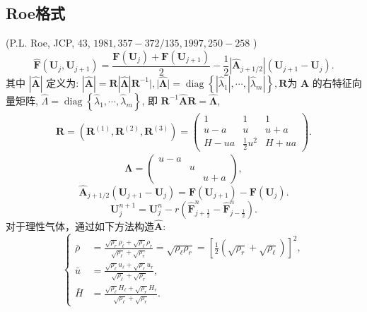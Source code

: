 \documentclass[12pt]{article}
\begin{document}
\subsection{Roe格式}

(P.L. Roe, JCP, 43, $1981,357-372 / 135,1997,250-258$ )
\begin{equation}
	\hat{\bm{F}}\left(\bm{U}_{j}, \bm{U}_{j+1}\right)=\frac{\bm{F}\left(\bm{U}_{j}\right)+\bm{F}\left(\bm{U}_{j+1}\right)}{2}-\frac{1}{2}\left|\hat{\bm{A}}_{j+1 / 2}\right|\left(\bm{U}_{j+1}-\bm{U}_{j}\right).
\end{equation}
其中 $|\hat{\bm{A}}|$ 定义为: $|\hat{\bm{A}}|=\bm{R}|\hat{\bm{\Lambda}}| \bm{R}^{-1}|,| \hat{\bm{\Lambda}} \mid=\operatorname{diag}\left\{\left|\hat{\lambda}_{1}\right|, \cdots,\left|\hat{\lambda}_{m}\right|\right\}, \bm{R}$为 $\hat{\bm{A}}$ 的右特征向量矩阵, $\hat{\Lambda}=\operatorname{diag}\left\{\hat{\lambda}_{1}, \cdots, \hat{\lambda}_{m}\right\}$, 即 $\bm{R}^{-1} \hat{\bm{A}} \bm{R}=\hat{\bm{\Lambda}}$,
\begin{equation}
	\begin{array}{c}
	\boldsymbol{R}=\left(\boldsymbol{R}^{(1)}, \boldsymbol{R}^{(2)}, \boldsymbol{R}^{(3)}\right)=\left(\begin{array}{ccc}
	1 & 1 & 1 \\
	u-a & u & u+a \\
	H-u a & \frac{1}{2} u^{2} & H+u a
	\end{array}\right).
	\end{array}
\end{equation}
\begin{equation}
	\bm{\Lambda} = \begin{pmatrix}
		u-a&&\\&u&\\&&u+a
	\end{pmatrix},
\end{equation}
\begin{equation}
	\hat{\bm{A}}_{j+1 / 2}\left(\bm{U}_{j+1}-\bm{U}_{j}\right)=\bm{F}\left(\bm{U}_{j+1}\right)-\bm{F}\left(\bm{U}_{j}\right).
\end{equation}
\begin{equation}
	\bm{U}^{n+1}_{j} =  \bm{U}^{n}_{j} - r \left( \hat{\bm{F}}^{n}_{j+\frac{1}{2}} - \hat{\bm{F}}^{n}_{j-\frac{1}{2}} \right).
\end{equation}
对于理性气体，通过如下方法构造$\hat{\bm{A}}$:
\begin{equation}
	\left\{
	\begin{aligned}
		\bar{\rho}&=\frac{\sqrt{\rho_{r}} \rho_{\ell}+\sqrt{\rho_{\ell}} \rho_{r}}{\sqrt{\rho_{\ell}}+\sqrt{\rho_{r}}}=\sqrt{\rho_{\ell} \rho_{r}}=\left[\frac{1}{2}\left(\sqrt{\rho_{r}} +\sqrt{\rho_{\ell}} \right)\right]^2, \\
		\bar{u}&=\frac{\sqrt{\rho_{\ell}} u_{\ell}+\sqrt{\rho_{r}} u_{r}}{\sqrt{\rho_{\ell}}+\sqrt{\rho_{r}}}, \\
		\bar{H}&=\frac{\sqrt{\rho_{\ell}} H_{\ell}+\sqrt{\rho_{r}} H_{r}}{\sqrt{\rho_{\ell}}+\sqrt{\rho_{r}}}.
	\end{aligned}\right.
\end{equation}
\end{document}
